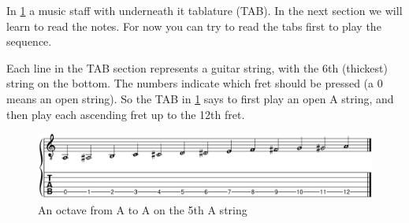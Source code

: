 
In \ref{fig:guitar_string_a_octave} a music staff with underneath it tablature (TAB). In the next section we will learn to read the notes. For now you can try to read the tabs first to play the sequence.

Each line in the TAB section represents a guitar string, with the 6th (thickest) string on the bottom. The numbers indicate which fret should be pressed (a 0 means an open string). So the TAB in \ref{fig:guitar_string_a_octave} says to first play an open A string, and then play each ascending fret up to the 12th fret.

\begin{figure}[h]
    \centering
    \includegraphics[width=\textwidth]{image/PitchesSharps.png}
    \caption{An octave from A to A on the 5th A string}
    \label{fig:guitar_string_a_octave}
\end{figure}
